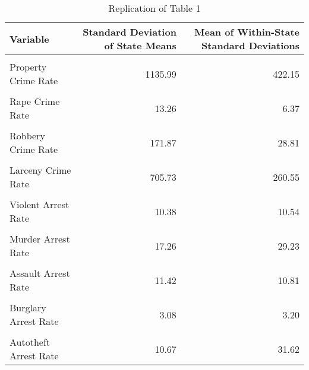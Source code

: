 \begin{table}[H]

\caption{\label{tab:tab:replicatetable1}Replication of Table 1}
\centering
\begin{tabular}[t]{lrr}
\toprule
Variable & Standard Deviation of State Means & Mean of Within-State Standard Deviations\\
\midrule
\cellcolor{gray!6}{Violent Crime Rate} & \cellcolor{gray!6}{306.62} & \cellcolor{gray!6}{78.19}\\
Property Crime Rate & 1135.99 & 422.15\\
\cellcolor{gray!6}{Murder Crime Rate} & \cellcolor{gray!6}{6.19} & \cellcolor{gray!6}{1.50}\\
Rape Crime Rate & 13.26 & 6.37\\
\cellcolor{gray!6}{Assault Crime Rate} & \cellcolor{gray!6}{144.28} & \cellcolor{gray!6}{57.62}\\
\addlinespace
Robbery Crime Rate & 171.87 & 28.81\\
\cellcolor{gray!6}{Burglary Crime Rate} & \cellcolor{gray!6}{372.52} & \cellcolor{gray!6}{181.39}\\
Larceny Crime Rate & 705.73 & 260.55\\
\cellcolor{gray!6}{Autotheft Crime Rate} & \cellcolor{gray!6}{210.57} & \cellcolor{gray!6}{82.24}\\
Violent Arrest Rate & 10.38 & 10.54\\
\addlinespace
\cellcolor{gray!6}{Property Arrest Rate} & \cellcolor{gray!6}{3.07} & \cellcolor{gray!6}{3.23}\\
Murder Arrest Rate & 17.26 & 29.23\\
\cellcolor{gray!6}{Rape Arrest Rate} & \cellcolor{gray!6}{11.15} & \cellcolor{gray!6}{10.65}\\
Assault Arrest Rate & 11.42 & 10.81\\
\cellcolor{gray!6}{Robery Arrest Rate} & \cellcolor{gray!6}{8.83} & \cellcolor{gray!6}{8.09}\\
\addlinespace
Burglary Arrest Rate & 3.08 & 3.20\\
\cellcolor{gray!6}{Larceny Arrest Rate} & \cellcolor{gray!6}{3.42} & \cellcolor{gray!6}{3.49}\\
Autotheft Arrest Rate & 10.67 & 31.62\\
\bottomrule
\end{tabular}
\end{table}
